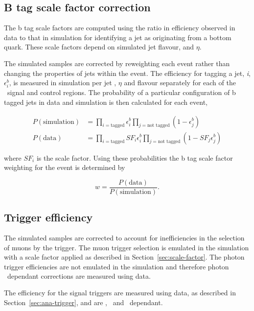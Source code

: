 \subsection{B tag scale factor correction}

The b tag scale factors are computed using the ratio in efficiency observed in data
to that in simulation for identifying a jet as originating from a bottom
quark. These scale factors depend on simulated jet flavour, \pt and $\eta$. 

The simulated samples are corrected by reweighting
each event rather than changing the properties of jets within the event. 
The efficiency for tagging a jet, \textit{i}, $\epsilon_{i}^{b}$, is measured in simulation per 
jet \pt, $\eta$ and flavour separately for each of the 
\alphat~signal and control regions. The probability of a particular configuration 
of b tagged jets in data and simulation is then calculated for each event,

\begin{align}
P(\text{simulation}) &= \prod_{i=\text{tagged}} \epsilon^{b}_{i} \prod_{j=\text{not tagged}} (1-\epsilon^{b}_{j})\\
P(\text{data}) &= \prod_{i=\text{tagged}} SF_{i}\epsilon^{b}_{i} \prod_{j=\text{not tagged}} (1-SF_{j}\epsilon^{b}_{j})
\end{align}

where $SF_{i}$ is the scale factor. Using these probabilities the b tag scale factor 
weighting for the event is determined by

\begin{equation}
w = \frac{P(\text{data})}{P(\text{simulation})}.
\end{equation}

\subsection{Trigger efficiency}

The simulated samples are corrected to account for inefficiencies in the selection of muons
by the trigger. The muon trigger selection is emulated in the simulation with a scale factor
applied as described in Section~\ref{sec:scale-factor}. The photon trigger efficiencies
are not emulated in the simulation and therefore photon \pt~dependant corrections are measured 
using data. 

The efficiency for the signal triggers are measured using data, as described 
in Section~\ref{sec:ana-trigger}, and are \scalht, \njet~and \mht~dependant.


